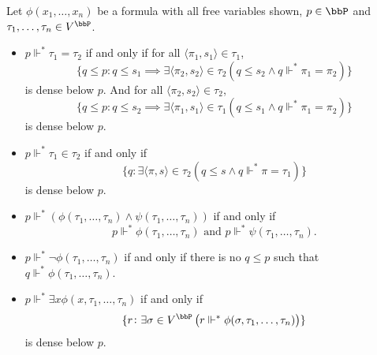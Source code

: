 \begin{definition}
    Let $\phi(x_1,\dots,x_n)$ be a formula with all free variables shown, $p\in\bbP$ and $\tau_1,\dots,\tau_n\in V^\bbP$.
    \begin{itemize}
        \item $p\Vdash^*\tau_1 = \tau_2$ if and only if for all $\langle\pi_1,s_1\rangle\in\tau_1$,
        \begin{equation*}
            \{q\le p\colon q\le s_1\implies\exists\langle\pi_2,s_2\rangle\in\tau_2\left(q\le s_2\wedge q\Vdash^*\pi_1 = \pi_2\right)\}
        \end{equation*}
        is dense below $p$. And for all $\langle\pi_2,s_2\rangle\in\tau_2$, 
        \begin{equation*}
            \{q\le p\colon q\le s_2\implies\exists\langle\pi_1,s_1\rangle\in\tau_1\left(q\le s_1\wedge q\Vdash^*\pi_1 = \pi_2\right)\}
        \end{equation*}
        is dense below $p$.

        \item $p\Vdash^*\tau_1\in\tau_2$ if and only if 
        \begin{equation*}
            \{q\colon\exists\langle\pi,s\rangle\in\tau_2\left(q\le s\wedge q\Vdash^*\pi = \tau_1\right)\}
        \end{equation*}
        is dense below $p$.

        \item $p\Vdash^*\left(\phi(\tau_1,\dots,\tau_n)\wedge\psi(\tau_1,\dots,\tau_n)\right)$ if and only if 
        \begin{equation*}
            p\Vdash^*\phi(\tau_1,\dots,\tau_n)\text{ and }p\Vdash^*\psi(\tau_1,\dots,\tau_n).
        \end{equation*}

        \item $p\Vdash^*\neg\phi(\tau_1,\dots,\tau_n)$ if and only if there is no $q\le p$ such that $q\Vdash^*\phi(\tau_1,\dots,\tau_n)$.

        \item $p\Vdash^*\exists x\phi(x,\tau_1,\dots,\tau_n)$ if and only if 
        \begin{equation*}
            \{r\colon\exists\sigma\in V^\bbP\left(r\Vdash^*\phi(\sigma,\tau_1,\dots,\tau_n)\right)\}
        \end{equation*}
        is dense below $p$.
    \end{itemize}
\end{definition}

